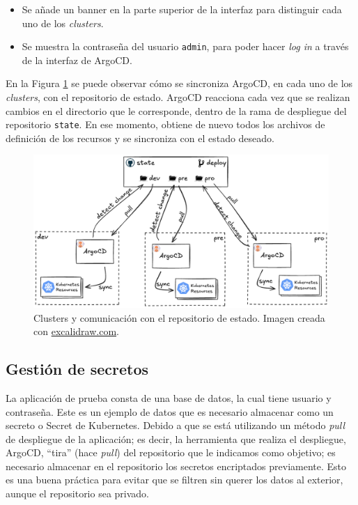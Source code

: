 \begin{itemize}
  \item Se añade un banner en la parte superior de la interfaz para distinguir cada uno de los \textit{clusters}.
  \item Se muestra la contraseña del usuario \texttt{admin}, para poder hacer \textit{log in} a través de la interfaz de ArgoCD.
\end{itemize}

En la Figura \ref{fig:clusters} se puede observar cómo se sincroniza ArgoCD, en cada uno de los \textit{clusters}, con el repositorio de estado. ArgoCD reacciona cada vez que se realizan cambios en el directorio que le corresponde, dentro de la rama de despliegue del repositorio \texttt{state}. En ese momento, obtiene de nuevo todos los archivos de definición de los recursos y se sincroniza con el estado deseado.

\begin{figure}
  \centerline{\includegraphics[width=15cm]{figuras/clusters}}
  \caption{Clusters y comunicación con el repositorio de estado. Imagen creada con \href{https://excalidraw.com}{excalidraw.com}.}
  \label{fig:clusters}
\end{figure}


\subsection*{Gestión de secretos}
\label{subsec:secretos}

La aplicación de prueba consta de una base de datos, la cual tiene usuario y contraseña. Este es un ejemplo de datos que es necesario almacenar como un secreto o Secret de Kubernetes. Debido a que se está utilizando un método \textit{pull}\cite{pull} de despliegue de la aplicación; es decir, la herramienta que realiza el despliegue, ArgoCD, ``tira'' (hace \textit{pull}) del repositorio que le indicamos como objetivo; es necesario almacenar en el repositorio los secretos encriptados previamente. Esto es una buena práctica para evitar que se filtren sin querer los datos al exterior, aunque el repositorio sea privado.

